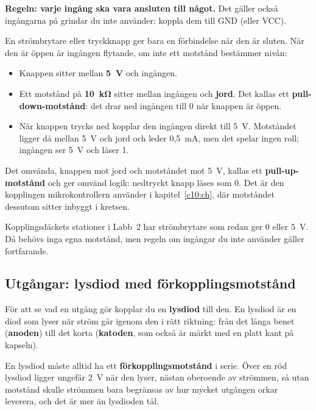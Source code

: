 \textbf{Regeln: varje ingång ska vara ansluten till något.} Det gäller också ingångarna på grindar
du inte använder: koppla dem till GND (eller VCC).

En strömbrytare eller tryckknapp ger bara en förbindelse när den är sluten. När den är öppen är
ingången flytande, om inte ett motstånd bestämmer nivån:


\begin{itemize}
  \item Knappen sitter mellan \textbf{5~V} och ingången.
  \item Ett motstånd på \textbf{10~kΩ} sitter mellan ingången och \textbf{jord}. Det kallas ett
    \textbf{pull-down-motstånd}: det drar ned ingången till 0 när knappen är öppen.
  \item När knappen trycks ned kopplar den ingången direkt till 5~V. Motståndet ligger då mellan
    5~V och jord och leder 0,5~mA, men det spelar ingen roll; ingången ser 5~V och läser 1.
\end{itemize}

Det omvända, knappen mot jord och motståndet mot 5~V, kallas ett \textbf{pull-up-motstånd} och ger
omvänd logik: nedtryckt knapp läses som 0. Det är den kopplingen mikrokontrollern använder i
kapitel~\ref{c10:ch}, där motståndet dessutom sitter inbyggt i kretsen.

Kopplingsdäckets stationer i Labb~2 har strömbrytare som redan ger 0 eller 5~V. Då behövs inga egna
motstånd, men regeln om ingångar du inte använder gäller fortfarande.

\subsection{Utgångar: lysdiod med förkopplingsmotstånd}
\label{c4:b5}
För att se vad en utgång gör kopplar du en \textbf{lysdiod} till den. En lysdiod är en diod som
lyser när ström går igenom den i rätt riktning: från det långa benet (\textbf{anoden}) till det
korta (\textbf{katoden}, som också är märkt med en platt kant på kapseln).

En lysdiod måste alltid ha ett \textbf{förkopplingsmotstånd} i serie. Över en röd lysdiod ligger
ungefär 2~V när den lyser, nästan oberoende av strömmen, så utan motstånd skulle strömmen bara
begränsas av hur mycket utgången orkar leverera, och det är mer än lysdioden tål.

